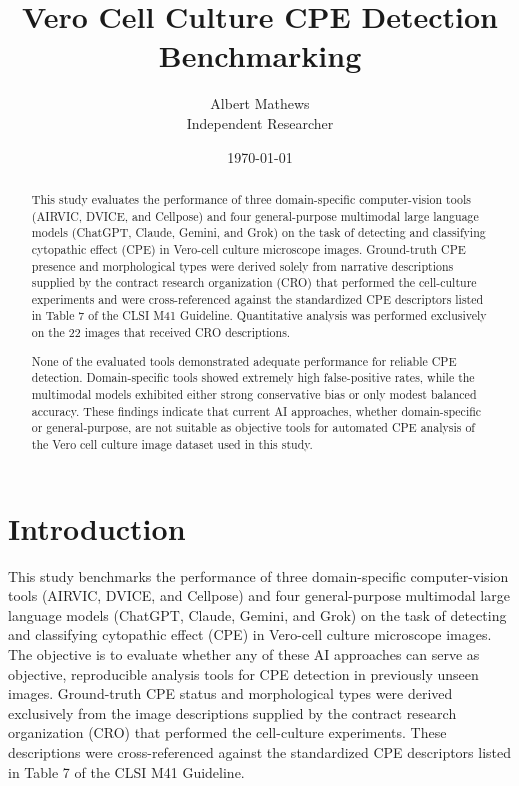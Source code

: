 \documentclass[12pt,a4paper]{article}
\title{\textbf{Vero Cell Culture CPE Detection Benchmarking}}
\author{Albert Mathews \\ Independent Researcher}
\date{\today}
\begin{document}
\maketitle

\begin{abstract}
This study evaluates the performance of three domain-specific computer-vision tools (AIRVIC, DVICE, and Cellpose) and four general-purpose multimodal large language models (ChatGPT, Claude, Gemini, and Grok) on the task of detecting and classifying cytopathic effect (CPE) in Vero-cell culture microscope images. Ground-truth CPE presence and morphological types were derived solely from narrative descriptions supplied by the contract research organization (CRO) that performed the cell-culture experiments and were cross-referenced against the standardized CPE descriptors listed in Table 7 of the CLSI M41 Guideline. Quantitative analysis was performed exclusively on the 22 images that received CRO descriptions.

None of the evaluated tools demonstrated adequate performance for reliable CPE detection. Domain-specific tools showed extremely high false-positive rates, while the multimodal models exhibited either strong conservative bias or only modest balanced accuracy. These findings indicate that current AI approaches, whether domain-specific or general-purpose, are not suitable as objective tools for automated CPE analysis of the Vero cell culture image dataset used in this study.
\end{abstract}

\section{Introduction}
This study benchmarks the performance of three domain-specific computer-vision tools (AIRVIC, DVICE, and Cellpose) and four general-purpose multimodal large language models (ChatGPT, Claude, Gemini, and Grok) on the task of detecting and classifying cytopathic effect (CPE) in Vero-cell culture microscope images. The objective is to evaluate whether any of these AI approaches can serve as objective, reproducible analysis tools for CPE detection in previously unseen images. Ground-truth CPE status and morphological types were derived exclusively from the image descriptions supplied by the contract research organization (CRO) that performed the cell-culture experiments. These descriptions were cross-referenced against the standardized CPE descriptors listed in Table 7 of the CLSI M41 Guideline.
\end{document}
